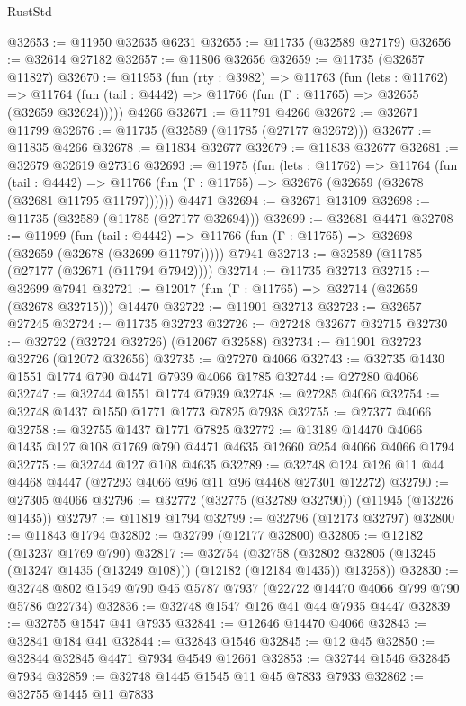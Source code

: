 \begin{lexlean}{RustStd}
\begin{coremodule}
@32653 := @11950 @32635 @6231
@32655 := @11735 (@32589 @27179)
@32656 := @32614 @27182
@32657 := @11806 @32656
@32659 := @11735 (@32657 @11827)
@32670 := @11953
    (fun (rty : @3982) =>
    @11763
      (fun (lets : @11762) =>
      @11764 (fun (tail : @4442) => @11766 (fun (Γ : @11765) => @32655 (@32659 @32624)))))
    @4266
@32671 := @11791 @4266
@32672 := @32671 @11799
@32676 := @11735 (@32589 (@11785 (@27177 @32672)))
@32677 := @11835 @4266
@32678 := @11834 @32677
@32679 := @11838 @32677
@32681 := @32679 @32619 @27316
@32693 := @11975
    (fun (lets : @11762) =>
    @11764
      (fun (tail : @4442) =>
      @11766 (fun (Γ : @11765) => @32676 (@32659 (@32678 (@32681 @11795 @11797))))))
    @4471
@32694 := @32671 @13109
@32698 := @11735 (@32589 (@11785 (@27177 @32694)))
@32699 := @32681 @4471
@32708 := @11999
    (fun (tail : @4442) => @11766 (fun (Γ : @11765) => @32698 (@32659 (@32678 (@32699 @11797)))))
    @7941
@32713 := @32589 (@11785 (@27177 (@32671 (@11794 @7942))))
@32714 := @11735 @32713
@32715 := @32699 @7941
@32721 := @12017 (fun (Γ : @11765) => @32714 (@32659 (@32678 @32715))) @14470
@32722 := @11901 @32713
@32723 := @32657 @27245
@32724 := @11735 @32723
@32726 := @27248 @32677 @32715
@32730 := @32722 (@32724 @32726) (@12067 @32588)
@32734 := @11901 @32723 @32726 (@12072 @32656)
@32735 := @27270 @4066
@32743 := @32735 @1430 @1551 @1774 @790 @4471 @7939 @4066 @1785
@32744 := @27280 @4066
@32747 := @32744 @1551 @1774 @7939
@32748 := @27285 @4066
@32754 := @32748 @1437 @1550 @1771 @1773 @7825 @7938
@32755 := @27377 @4066
@32758 := @32755 @1437 @1771 @7825
@32772 := @13189 @14470 @4066 @1435 @127 @108 @1769 @790 @4471 @4635 @12660 @254 @4066 @4066 @1794
@32775 := @32744 @127 @108 @4635
@32789 := @32748 @124 @126 @11 @44 @4468 @4447 (@27293 @4066 @96 @11 @96 @4468 @27301 @12272)
@32790 := @27305 @4066
@32796 := @32772 (@32775 (@32789 @32790)) (@11945 (@13226 @1435))
@32797 := @11819 @1794
@32799 := @32796 (@12173 @32797)
@32800 := @11843 @1794
@32802 := @32799 (@12177 @32800)
@32805 := @12182 (@13237 @1769 @790)
@32817 := @32754
    (@32758 (@32802 @32805 (@13245 (@13247 @1435 (@13249 @108))) (@12182 (@12184 @1435)) @13258))
@32830 := @32748 @802 @1549 @790 @45 @5787 @7937 (@22722 @14470 @4066 @799 @790 @5786 @22734)
@32836 := @32748 @1547 @126 @41 @44 @7935 @4447
@32839 := @32755 @1547 @41 @7935
@32841 := @12646 @14470 @4066
@32843 := @32841 @184 @41
@32844 := @32843 @1546
@32845 := @12 @45
@32850 := @32844 @32845 @4471 @7934 @4549 @12661
@32853 := @32744 @1546 @32845 @7934
@32859 := @32748 @1445 @1545 @11 @45 @7833 @7933
@32862 := @32755 @1445 @11 @7833

\end{coremodule}
\end{lexlean}

